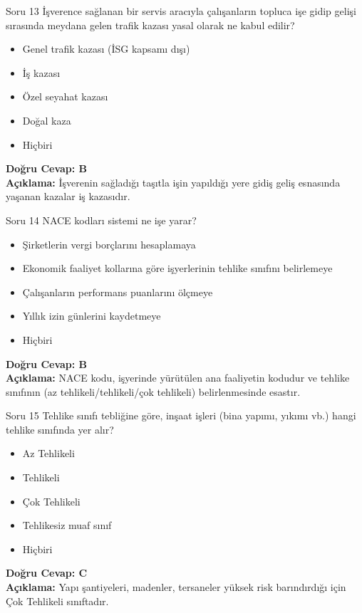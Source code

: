 \documentclass[12pt,a4paper]{article}
\begin{document}
\begin{testcard}{Soru 13}
    İşverence sağlanan bir servis aracıyla çalışanların topluca işe gidip gelişi sırasında meydana gelen trafik kazası yasal olarak ne kabul edilir?
    \begin{itemize}
        \item[A)] Genel trafik kazası (İSG kapsamı dışı)
        \item[B)] İş kazası
        \item[C)] Özel seyahat kazası
        \item[D)] Doğal kaza
        \item[E)] Hiçbiri
    \end{itemize}
    \tcblower
    \textbf{Doğru Cevap: B} \\
    \textbf{Açıklama:} İşverenin sağladığı taşıtla işin yapıldığı yere gidiş geliş esnasında yaşanan kazalar iş kazasıdır.
\end{testcard}

\begin{testcard}{Soru 14}
    NACE kodları sistemi ne işe yarar?
    \begin{itemize}
        \item[A)] Şirketlerin vergi borçlarını hesaplamaya
        \item[B)] Ekonomik faaliyet kollarına göre işyerlerinin tehlike sınıfını belirlemeye
        \item[C)] Çalışanların performans puanlarını ölçmeye
        \item[D)] Yıllık izin günlerini kaydetmeye
        \item[E)] Hiçbiri
    \end{itemize}
    \tcblower
    \textbf{Doğru Cevap: B} \\
    \textbf{Açıklama:} NACE kodu, işyerinde yürütülen ana faaliyetin kodudur ve tehlike sınıfının (az tehlikeli/tehlikeli/çok tehlikeli) belirlenmesinde esastır.
\end{testcard}

\begin{testcard}{Soru 15}
    Tehlike sınıfı tebliğine göre, inşaat işleri (bina yapımı, yıkımı vb.) hangi tehlike sınıfında yer alır?
    \begin{itemize}
        \item[A)] Az Tehlikeli
        \item[B)] Tehlikeli
        \item[C)] Çok Tehlikeli
        \item[D)] Tehlikesiz muaf sınıf
        \item[E)] Hiçbiri
    \end{itemize}
    \tcblower
    \textbf{Doğru Cevap: C} \\
    \textbf{Açıklama:} Yapı şantiyeleri, madenler, tersaneler yüksek risk barındırdığı için Çok Tehlikeli sınıftadır.
\end{testcard}
\end{document}
